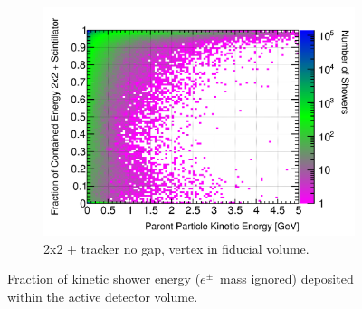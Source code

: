 \documentclass[10pt,a4paper,openany]{article}
\begin{document}
\begin{figure}[!htb]
\begin{subfigure}[b]{0.49\textwidth}
		\centering
		\includegraphics[width=1.0\textwidth]{EM_contained_frac_2x2_Scintillator_fiducial.png}
		\caption{2x2 + tracker no gap, vertex in fiducial volume.}
		\label{}
	\end{subfigure}	
  \caption{Fraction of kinetic shower energy ($e^{\pm}$~mass ignored) deposited within the active detector volume.}
\end{figure}

\clearpage
\end{document}

